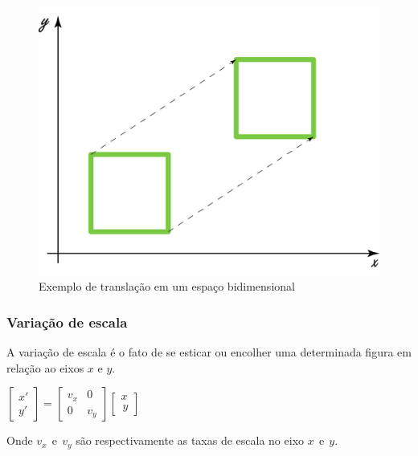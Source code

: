 \documentclass[9pt, a4paper, nofonttune, journal]{IEEEtran}
\begin{document}
\begin{figure}[H]
\begin{center}
\includegraphics[scale=0.25]{figuras/translation1.png}
\caption{Exemplo de translação em um espaço bidimensional}
\end{center}
\end{figure}

\subsubsection{Variação de escala}

A variação de escala é o fato de se esticar ou encolher uma determinada figura em relação ao eixos $x$ e $y$.

\begin{center}
$\begin{bmatrix}x'\\
y'
\end{bmatrix}=\begin{bmatrix}v_{x} & 0\\
0 & v_{y}
\end{bmatrix}\begin{bmatrix}x\\
\frac{}{}y
\end{bmatrix}$\end{center}
Onde $v_{x}~~ \textrm{e} ~~ v_{y}$ são respectivamente as taxas de escala no eixo $x~~ \textrm{e} ~~y$.\cite{CGPPBook1}
\end{document}
